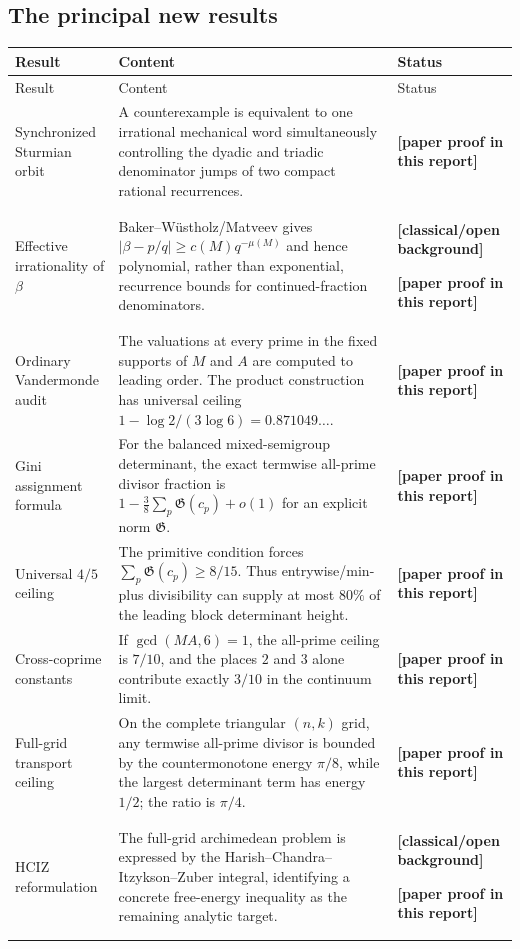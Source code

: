 \documentclass[11pt,oneside]{article}
\theoremstyle{definition}
\theoremstyle{remark}
\newcommand{\statusnew}{\textcolor{newgreen}{\textbf{[paper proof in this report]}}}
\newcommand{\statusknown}{\textcolor{classicalgray}{\textbf{[classical/open background]}}}
\begin{document}
\subsection{The principal new results}

\begin{longtable}{@{}>{\raggedright\arraybackslash}p{}>{\raggedright\arraybackslash}p{}>{\raggedright\arraybackslash}p{}@{}}
\toprule
Result & Content & Status\\
\midrule
\endfirsthead
\toprule
Result & Content & Status\\
\midrule
\endhead
Synchronized Sturmian orbit & A counterexample is equivalent to one irrational mechanical word simultaneously controlling the dyadic and triadic denominator jumps of two compact rational recurrences. & \statusnew\\
\addlinespace
Effective irrationality of $\beta$ & Baker--W\"ustholz/Matveev gives $|\beta-p/q|\ge c(M)q^{-\mu(M)}$ and hence polynomial, rather than exponential, recurrence bounds for continued-fraction denominators. & \statusknown{}\par\statusnew\\
\addlinespace
Ordinary Vandermonde audit & The valuations at every prime in the fixed supports of $M$ and $A$ are computed to leading order.  The product construction has universal ceiling $1-\log2/(3\log6)=0.871049\ldots$. & \statusnew\\
\addlinespace
Gini assignment formula & For the balanced mixed-semigroup determinant, the exact termwise all-prime divisor fraction is $1-\frac38\sum_p\mathfrak G(c_p)+o(1)$ for an explicit norm $\mathfrak G$. & \statusnew\\
\addlinespace
Universal $4/5$ ceiling & The primitive condition forces $\sum_p\mathfrak G(c_p)\ge8/15$.  Thus entrywise/min-plus divisibility can supply at most $80\%$ of the leading block determinant height. & \statusnew\\
\addlinespace
Cross-coprime constants & If $\gcd(MA,6)=1$, the all-prime ceiling is $7/10$, and the places $2$ and $3$ alone contribute exactly $3/10$ in the continuum limit. & \statusnew\\
\addlinespace
Full-grid transport ceiling & On the complete triangular $(n,k)$ grid, any termwise all-prime divisor is bounded by the countermonotone energy $\pi/8$, while the largest determinant term has energy $1/2$; the ratio is $\pi/4$. & \statusnew\\
\addlinespace
HCIZ reformulation & The full-grid archimedean problem is expressed by the Harish--Chandra--Itzykson--Zuber integral, identifying a concrete free-energy inequality as the remaining analytic target. & \statusknown{}\par\statusnew\\
\bottomrule
\end{longtable}
\end{document}
